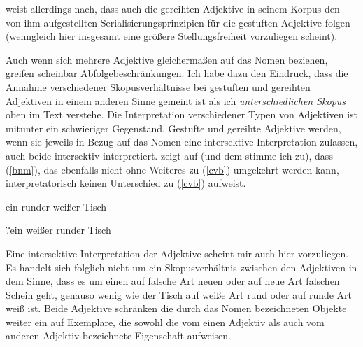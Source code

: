 {\citet[381-383]{Trost2006} weist allerdings nach, dass auch die gereihten Adjektive in seinem Korpus den von ihm aufgestellten Serialisierungsprinzipien für die gestuften Adjektive folgen (wenngleich hier insgesamt eine größere Stellungsfreiheit vorzuliegen scheint). 

Auch wenn sich mehrere Adjektive gleichermaßen auf das Nomen beziehen, greifen scheinbar Abfolgebeschränkungen. Ich habe dazu den Eindruck, dass die Annahme verschiedener Skopusverhältnisse bei gestuften und gereihten Adjektiven in einem anderen Sinne gemeint ist als ich \textit{unterschiedlichen Skopus} oben im Text verstehe. Die Interpretation verschiedener Typen von Adjektiven ist mitunter ein schwieriger Gegenstand. Gestufte und gereihte Adjektive werden, wenn sie jeweils in Bezug auf das Nomen eine intersektive Interpretation zulassen, auch beide intersektiv interpretiert. \citet[60-61]{Posner1980} zeigt auf (und dem stimme ich zu), dass (\ref{bnm}), das ebenfalls nicht ohne Weiteres zu (\ref{cvb}) umgekehrt werden kann, interpretatorisch keinen Unterschied zu (\ref{cvb}) aufweist.

\begin{exe}
	\ex\label{bnm} 
	ein runder weißer Tisch
\end{exe}
\vspace{-0.65cm}
\begin{exe}
	\ex\label{cvb} 
	?ein weißer runder Tisch
	\hfill\hbox{\citet[63]{Posner1980}}
\end{exe}
Eine intersektive Interpretation der Adjektive scheint mir auch hier vorzuliegen. Es handelt sich folglich nicht um ein Skopusverhältnis zwischen den Adjektiven in dem Sinne, dass es um einen auf falsche Art neuen oder auf neue Art falschen Schein geht, genauso wenig wie der Tisch auf weiße Art rund oder auf runde Art weiß ist. Beide Adjektive schränken die durch das Nomen bezeichneten Objekte weiter ein auf Exemplare, die sowohl die vom einen Adjektiv als auch vom anderen Adjektiv bezeichnete Eigenschaft aufweisen.}
 
